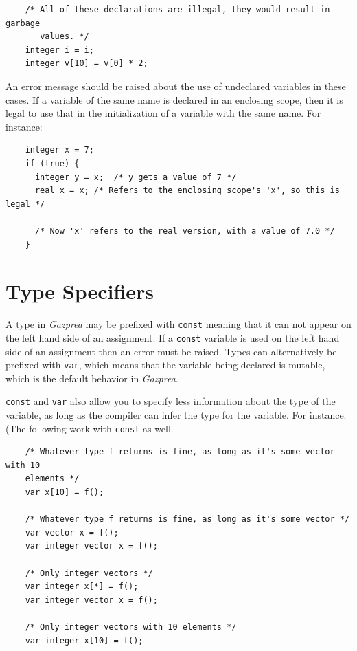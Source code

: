 \documentclass{article}
\begin{document}
  \begin{lstlisting}
    /* All of these declarations are illegal, they would result in garbage
       values. */
    integer i = i;
    integer v[10] = v[0] * 2;
  \end{lstlisting}

  An error message should be raised about the use of undeclared variables in these cases. If a variable of the same
  name is declared in an enclosing scope, then it is legal to use that in the initialization of a variable with the
  same name. For instance:

  \begin{lstlisting}
    integer x = 7;
    if (true) {
      integer y = x;  /* y gets a value of 7 */
      real x = x; /* Refers to the enclosing scope's 'x', so this is legal */

      /* Now 'x' refers to the real version, with a value of 7.0 */
    }
  \end{lstlisting}


\section{Type Specifiers}\label{sec:typeSpecifiers}
  A type in \textit{Gazprea} may be prefixed with \texttt{const} meaning that it can not appear on the left hand side
  of an assignment. If a \texttt{const} variable is used on the left hand side of an assignment then an error must be
  raised. Types can alternatively be prefixed with \texttt{var}, which means that the variable being declared is
  mutable, which is the default behavior in \textit{Gazprea}.

  \texttt{const} and \texttt{var} also allow you to specify less information about the type of the variable, as long
  as the compiler can infer the type for the variable. For instance: (The following work with \texttt{const} as well.

  \begin{lstlisting}
    /* Whatever type f returns is fine, as long as it's some vector with 10
    elements */
    var x[10] = f();

    /* Whatever type f returns is fine, as long as it's some vector */
    var vector x = f();
    var integer vector x = f();

    /* Only integer vectors */
    var integer x[*] = f();
    var integer vector x = f();

    /* Only integer vectors with 10 elements */
    var integer x[10] = f();
  \end{lstlisting}
\end{document}
